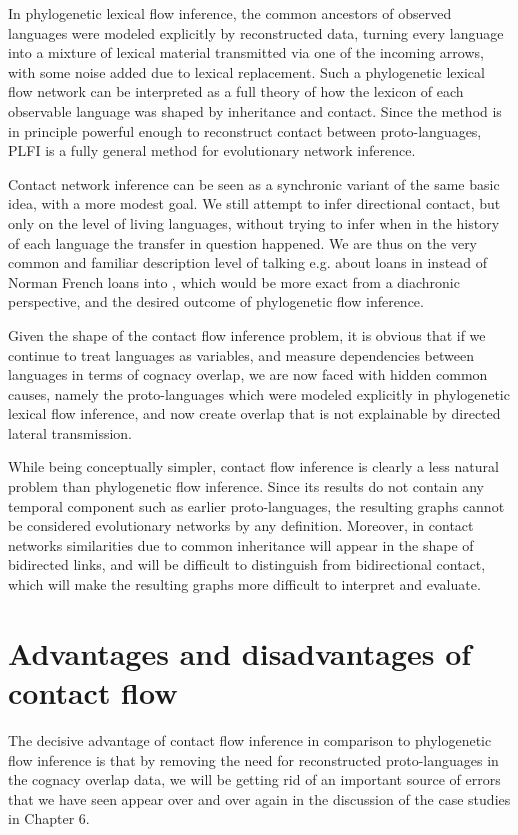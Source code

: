 In phylogenetic lexical flow inference, the common ancestors of observed languages were modeled explicitly by reconstructed data, turning every language into a mixture of lexical material transmitted via one of the incoming arrows, with some noise added due to lexical replacement. Such a phylogenetic lexical flow network can be interpreted as a full theory of how the lexicon of each observable language was shaped by inheritance and contact. Since the method is in principle powerful enough to reconstruct contact between proto-languages, PLFI is a fully general method for evolutionary network inference.

Contact network inference can be seen as a synchronic variant of the same basic idea, with a more modest goal. We still attempt to infer directional contact, but only on the level of living languages, without trying to infer when in the history of each language the transfer in question happened. We are thus on the very common and familiar description level of talking e.g. about  loans in  instead of Norman French loans into , which would be more exact from a diachronic perspective, and the desired outcome of phylogenetic flow inference.

Given the shape of the contact flow inference problem, it is obvious that if we continue to treat languages as variables, and measure dependencies between languages in terms of cognacy overlap, we are now faced with hidden common causes, namely the proto-languages which were modeled explicitly in phylogenetic lexical flow inference, and now create overlap that is not explainable by directed lateral transmission.

While being conceptually simpler, contact flow inference is clearly a less natural problem than phylogenetic flow inference. Since its results do not contain any temporal component such as earlier proto-languages, the resulting graphs cannot be considered evolutionary networks by any definition. Moreover, in contact networks similarities due to common inheritance will appear in the shape of bidirected links, and will be difficult to distinguish from bidirectional contact, which will make the resulting graphs more difficult to interpret and evaluate.

\section{Advantages and disadvantages of contact flow}
The decisive advantage of contact flow inference in comparison to phylogenetic flow inference is that by removing the need for reconstructed proto-languages in the cognacy overlap data, we will be getting rid of an important source of errors that we have seen appear over and over again in the discussion of the case studies in Chapter 6.

